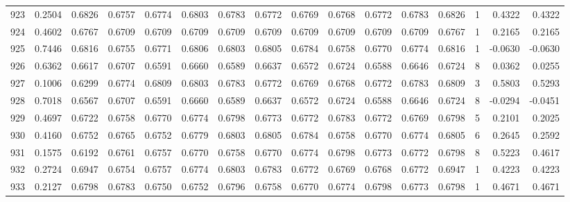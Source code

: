 \begin{tabular}{lrrrrrrrrrrrrrrr}
923 &      0.2504 &  0.6826 &  0.6757 &  0.6774 &  0.6803 &  0.6783 &  0.6772 &  0.6769 &  0.6768 &  0.6772 &   0.6783 &     0.6826 &      1 &                    0.4322 &                     0.4322 \\
924 &      0.4602 &  0.6767 &  0.6709 &  0.6709 &  0.6709 &  0.6709 &  0.6709 &  0.6709 &  0.6709 &  0.6709 &   0.6709 &     0.6767 &      1 &                    0.2165 &                     0.2165 \\
925 &      0.7446 &  0.6816 &  0.6755 &  0.6771 &  0.6806 &  0.6803 &  0.6805 &  0.6784 &  0.6758 &  0.6770 &   0.6774 &     0.6816 &      1 &                   -0.0630 &                    -0.0630 \\
926 &      0.6362 &  0.6617 &  0.6707 &  0.6591 &  0.6660 &  0.6589 &  0.6637 &  0.6572 &  0.6724 &  0.6588 &   0.6646 &     0.6724 &      8 &                    0.0362 &                     0.0255 \\
927 &      0.1006 &  0.6299 &  0.6774 &  0.6809 &  0.6803 &  0.6783 &  0.6772 &  0.6769 &  0.6768 &  0.6772 &   0.6783 &     0.6809 &      3 &                    0.5803 &                     0.5293 \\
928 &      0.7018 &  0.6567 &  0.6707 &  0.6591 &  0.6660 &  0.6589 &  0.6637 &  0.6572 &  0.6724 &  0.6588 &   0.6646 &     0.6724 &      8 &                   -0.0294 &                    -0.0451 \\
929 &      0.4697 &  0.6722 &  0.6758 &  0.6770 &  0.6774 &  0.6798 &  0.6773 &  0.6772 &  0.6783 &  0.6772 &   0.6769 &     0.6798 &      5 &                    0.2101 &                     0.2025 \\
930 &      0.4160 &  0.6752 &  0.6765 &  0.6752 &  0.6779 &  0.6803 &  0.6805 &  0.6784 &  0.6758 &  0.6770 &   0.6774 &     0.6805 &      6 &                    0.2645 &                     0.2592 \\
931 &      0.1575 &  0.6192 &  0.6761 &  0.6757 &  0.6770 &  0.6758 &  0.6770 &  0.6774 &  0.6798 &  0.6773 &   0.6772 &     0.6798 &      8 &                    0.5223 &                     0.4617 \\
932 &      0.2724 &  0.6947 &  0.6754 &  0.6757 &  0.6774 &  0.6803 &  0.6783 &  0.6772 &  0.6769 &  0.6768 &   0.6772 &     0.6947 &      1 &                    0.4223 &                     0.4223 \\
933 &      0.2127 &  0.6798 &  0.6783 &  0.6750 &  0.6752 &  0.6796 &  0.6758 &  0.6770 &  0.6774 &  0.6798 &   0.6773 &     0.6798 &      1 &                    0.4671 &                     0.4671 \\

\end{tabular}
